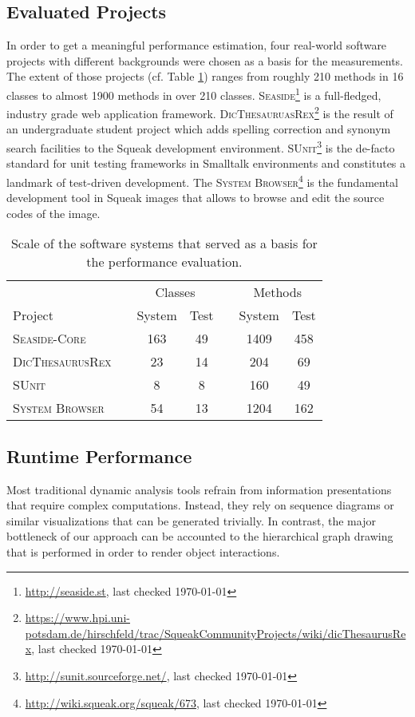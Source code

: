 \subsection{Evaluated Projects}
\label{ss:DiscussionProjects}
In order to get a meaningful performance estimation, four real-world software projects with different backgrounds were chosen as a basis for the measurements.
The extent of those projects (cf. Table \ref{t:EvaluationProjects}) ranges from roughly 210 methods in 16 classes to almost 1900 methods in over 210 classes.
\textsc{Seaside}\footnote{\url{http://seaside.st}, last checked \today} is a full-fledged, industry grade web application framework.
\textsc{DicThesauruasRex}\footnote{\url{https://www.hpi.uni-potsdam.de/hirschfeld/trac/SqueakCommunityProjects/wiki/dicThesaurusRex}, last checked \today} is the result of an undergraduate student project which adds spelling correction and synonym search facilities to the Squeak development environment.
\textsc{SUnit}\footnote{\url{http://sunit.sourceforge.net/}, last checked \today} is the de-facto standard for unit testing frameworks in Smalltalk environments and constitutes a landmark of test-driven development.
The \textsc{System Browser}\footnote{\url{http://wiki.squeak.org/squeak/673}, last checked \today} is the fundamental development tool in Squeak images that allows to browse and edit the source codes of the image.

\begin{table}
\centering
\begin{tabular}{lcccccc}
\toprule[1.5pt]
\phantom{abc} & \phantom{abc} & \multicolumn{2}{c}{Classes} & \phantom{abc} & \multicolumn{2}{c}{Methods}  \\
\cmidrule{3-4} \cmidrule{6-7}
Project    && System & Test && System & Test \\
\midrule
\textsc{Seaside-Core}		&&	163	&	49	&&	1409	&	458	\\
\textsc{DicThesaurusRex}	&&	23	&	14	&&	204		&	69	\\
\textsc{SUnit}				&&	8	&	8	&&	160		&	49	\\
\textsc{System Browser}		&&	54	&	13	&&	1204	&	162	\\
\bottomrule[1.5pt]
\end{tabular}
\caption[Evaluated Software Systems]{Scale of the software systems that served as a basis for the performance evaluation.}
\label{t:EvaluationProjects}
\end{table}

\subsection{Runtime Performance}
\label{ss:DiscussionPerformance}
Most traditional dynamic analysis tools refrain from information presentations that require complex computations.
Instead, they rely on sequence diagrams or similar visualizations that can be generated trivially.
In contrast, the major bottleneck of our approach can be accounted to the hierarchical graph drawing that is performed in order to render object interactions.

